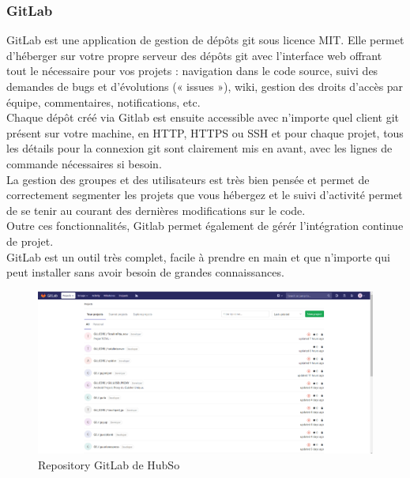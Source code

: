 \subsubsection{GitLab}
GitLab est une application de gestion de dépôts git sous licence MIT. Elle permet d'héberger sur votre propre serveur des dépôts git avec l'interface web offrant tout le nécessaire pour vos projets : navigation dans le code source, suivi des demandes de bugs et d'évolutions (« issues »), wiki, gestion des droits d'accès par équipe, commentaires, notifications, etc.\\
Chaque dépôt créé via Gitlab est ensuite accessible avec n’importe quel client git présent sur votre machine, en HTTP, HTTPS ou SSH et pour chaque projet, tous les détails pour la connexion git sont clairement mis en avant, avec les lignes de commande nécessaires si besoin.\\
La gestion des groupes et des utilisateurs est très bien pensée et permet de correctement segmenter les projets que vous hébergez et le suivi d’activité permet de se tenir au courant des dernières modifications sur le code. \\
Outre ces fonctionnalités, Gitlab permet également de gérér l'intégration continue de projet.\\
GitLab est un outil très complet, facile à prendre en main et que n’importe qui peut installer sans avoir besoin de grandes connaissances.
\begin{figure}[H]
	\centering
	\begin{minipage}{12cm}
		\centering
		\includegraphics[width=1\textwidth]{fig/gitlab.png}
	\end{minipage}
	\caption{Repository GitLab de HubSo}
	\label{fig:vdsadf}
\end{figure}
